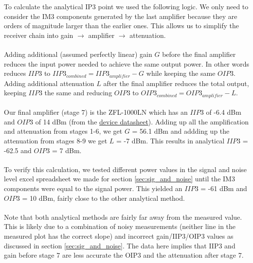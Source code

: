 \documentclass[letterpaper,12pt]{article}
\begin{document}
\noindent
To calculate the analytical IP3 point we used the following logic. We only need to consider the IM3 components generated by the last amplifier because they are orders of magnitude larger than the earlier ones. This allows us to simplify the receiver chain into gain $\to$ amplifier $\to$ attenuation.
\\
\\
\noindent
Adding additional (assumed perfectly linear) gain $G$ before the final amplifier reduces the input power needed to achieve the same output power. In other words reduces $IIP3$ to $IIP3_{combined} = IIP3_{amplifier} - G$ while keeping the same $OIP3$. Adding additional attenuation $L$ after the final amplifier reduces the total output, keeping $IIP3$ the same and reducing $OIP3$ to $OIP3_{combined} = OIP3_{amplifier} - L$.
\\
\\
\noindent
Our final amplifier (stage 7) is the ZFL-1000LN which has an $IIP3$ of -6.4 dBm and $OIP3$ of 14 dBm (from the \href{https://www.mouser.com/datasheet/2/1030/ZFL_1000LN_2b-2303490.pdf}{device datasheet}). Adding up all the amplification and attenuation from stages 1-6, we get $G$ = 56.1 dBm and addding up the attenuation from stages 8-9 we get $L$ = -7 dBm. This results in analytical $IIP3$ = -62.5 and $OIP3$ = 7 dBm.
\\
\\
\noindent
To verify this calculation, we tested different power values in the signal and noise level excel spreadsheet we made for section \ref{sec:sig_and_noise} until the IM3 components were equal to the signal power. This yielded an $IIP3$ = -61 dBm and $OIP3$ = 10 dBm, fairly close to the other analytical method.
\\
\\
\noindent
Note that both analytical methods are fairly far away from the measured value. This is likely due to a combination of noisy measurements (neither line in the measured plot has the correct slope) and incorrect gain/IIP3/OIP3 values as discussed in section \ref{sec:sig_and_noise}. The data here implies that IIP3 and gain before stage 7 are less accurate the OIP3 and the attenuation after stage 7.
\end{document}
